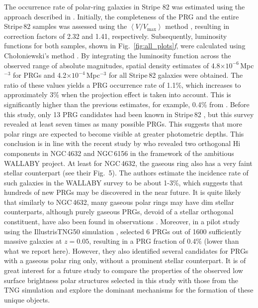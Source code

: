 \documentclass[letter]{aa}
\begin{document}
The occurrence rate of polar-ring galaxies in Stripe 82 was estimated using the approach described in \citet{2022MNRAS.516.3692S}. Initially, the completeness of the PRG and the entire Stripe\,82 samples was assessed using the $\left<V/V_\mathrm{max}\right>$ method \citep{1973ApJ...186..433H}, resulting in correction factors of 2.32 and 1.41, respectively. Subsequently, luminosity functions for both samples, shown in Fig.~\ref{fig:all_plots}{\it f}, were calculated using Cho\l{}oniewski's method \citep{1986MNRAS.223....1C}. By integrating the luminosity function across the observed range of absolute magnitudes, spatial density estimates of 4.8$\times 10^{-6}$\,Mpc$^{-3}$ for PRGs and 4.2$\times 10^{-4}$\,Mpc$^{-3}$ for all Stripe\,82 galaxies were obtained. The ratio of these values yields a PRG occurrence rate of 1.1\%, which increases to approximately 3\% when the projection effect is taken into account.
This is significantly higher than the previous estimates, for example, 0.4\% from \citet{reshetnikov2011polar}. Before this study, only 13 PRG candidates had been known in Stripe\,82 \citep{2011MNRAS.418..244M,mosenkov2022unveiling}, but this survey revealed at least seven times as many possible PRGs. This suggests that more polar rings are expected to become visible at greater photometric depths. This conclusion is in line with the recent study by \citet{2023MNRAS.525.4663D} who revealed two orthogonal H{\sc i} components in NGC\,4632 and NGC\,6156 in the framework of the ambitious WALLABY project. At least for NGC\,4632, the gaseous ring also has a very faint stellar counterpart (see their Fig.~5). The authors estimate the incidence rate of such galaxies in the WALLABY survey to be about 1-3\%, which suggests that hundreds of new PRGs may be discovered in the near future. It is quite likely that similarly to NGC\,4632, many gaseous polar rings may have dim stellar counterparts, although purely gaseous PRGs, devoid of a stellar orthogonal constituent, have also been found in observations \citep{2006A&A...451...99B,2009ApJ...696L...6S}.
Moreover, in a pilot study using the IllustrisTNG50 simulation \citep{2018MNRAS.473.4077P}, \citet{2023arXiv231018597S} selected 6 PRGs out of 1600 sufficiently massive galaxies at $z=0.05$, resulting in a PRG fraction of 0.4\% (lower than what we report here). However, they also identified several candidates for PRGs with a gaseous polar ring only, without a prominent stellar counterpart. It is of great interest for a future study to compare the properties of the observed low surface brightness polar structures selected in this study with those from the TNG simulation and explore the dominant mechanisms for the formation of these unique objects.
 
\end{document}
